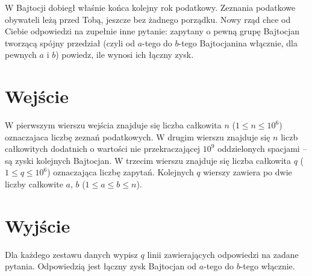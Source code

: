\documentclass{spiral-kurs}
\begin{document}
\makeheader
%
W Bajtocji dobiegł właśnie końca kolejny rok podatkowy. Zeznania podatkowe obywateli leżą przed Tobą, jeszcze bez żadnego porządku. Nowy rząd chce od Ciebie odpowiedzi na zupełnie inne pytanie: zapytany o pewną grupę Bajtocjan tworzącą spójny przedział (czyli od $a$-tego do $b$-tego Bajtocjanina włącznie, dla pewnych $a$ i $b$) powiedz, ile wynosi ich łączny zysk.

   \section{Wejście}
W pierwszym wierszu wejścia znajduje się liczba całkowita $n$ ($1 \le n \le 10^6$) oznaczajaca liczbę zeznań podatkowych. 
W drugim wierszu znajduje się $n$ liczb całkowitych dodatnich o wartości nie przekraczającej $10^9$ oddzielonych spacjami -- są zyski kolejnych Bajtocjan.
W trzecim wierszu znajduje się liczba całkowita $q$ ($1 \le q \le 10^6$) oznaczająca liczbę zapytań. Kolejnych $q$ wierszy zawiera po dwie liczby całkowite $a$, $b$ ($1 \leq a \leq b \leq n$).


  \section{Wyjście}
Dla każdego zestawu danych wypisz $q$ linii zawierających odpowiedzi na zadane pytania.
Odpowiedzią jest łączny zysk Bajtocjan od $a$-tego do $b$-tego włącznie.



  
\end{document}
